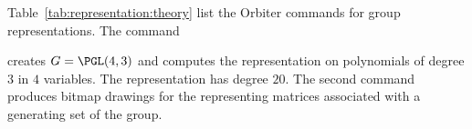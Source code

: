 Table~\ref{tab:representation:theory} list the Orbiter commands for group representations.
The command


creates $G=\PGL(4,3)$ and computes the representation 
on polynomials of degree $3$ in $4$ variables. 
The representation has degree $20.$
The second command produces bitmap drawings for the representing matrices 
associated with a generating set of the group.



